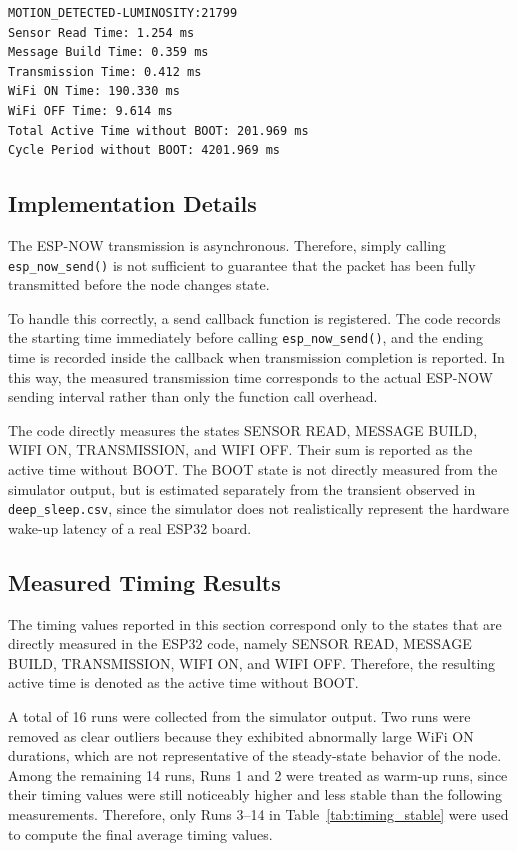 \documentclass{article}
\begin{document}
\begin{verbatim}
MOTION_DETECTED-LUMINOSITY:21799
Sensor Read Time: 1.254 ms
Message Build Time: 0.359 ms
Transmission Time: 0.412 ms
WiFi ON Time: 190.330 ms
WiFi OFF Time: 9.614 ms
Total Active Time without BOOT: 201.969 ms
Cycle Period without BOOT: 4201.969 ms
\end{verbatim}

\subsection{Implementation Details}

The ESP-NOW transmission is asynchronous. Therefore, simply calling \texttt{esp\_now\_send()} is not sufficient to guarantee that the packet has been fully transmitted before the node changes state.

To handle this correctly, a send callback function is registered. The code records the starting time immediately before calling \texttt{esp\_now\_send()}, and the ending time is recorded inside the callback when transmission completion is reported. In this way, the measured transmission time corresponds to the actual ESP-NOW sending interval rather than only the function call overhead.

The code directly measures the states SENSOR READ, MESSAGE BUILD, WIFI ON, TRANSMISSION, and WIFI OFF. Their sum is reported as the active time without BOOT. The BOOT state is not directly measured from the simulator output, but is estimated separately from the transient observed in \texttt{deep\_sleep.csv}, since the simulator does not realistically represent the hardware wake-up latency of a real ESP32 board.

\subsection{Measured Timing Results}

The timing values reported in this section correspond only to the states that are directly measured in the ESP32 code, namely SENSOR READ, MESSAGE BUILD, TRANSMISSION, WIFI ON, and WIFI OFF. Therefore, the resulting active time is denoted as the active time without BOOT.

A total of 16 runs were collected from the simulator output. Two runs were removed as clear outliers because they exhibited abnormally large WiFi ON durations, which are not representative of the steady-state behavior of the node. Among the remaining 14 runs, Runs 1 and 2 were treated as warm-up runs, since their timing values were still noticeably higher and less stable than the following measurements. Therefore, only Runs 3--14 in Table~\ref{tab:timing_stable} were used to compute the final average timing values.
\end{document}
